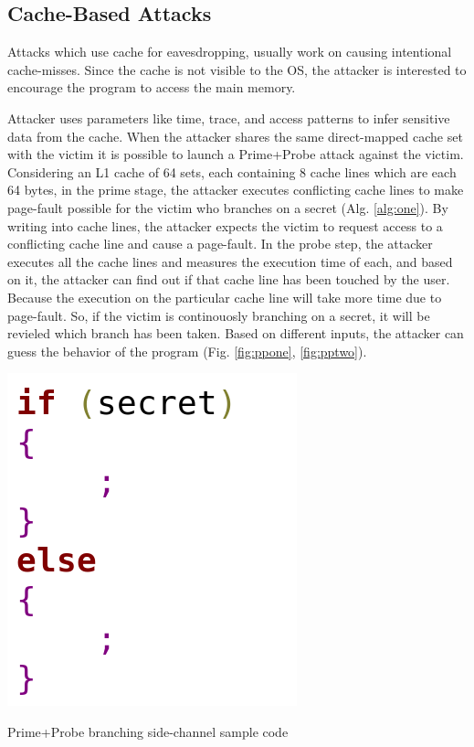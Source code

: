 \subsection{Cache-Based Attacks}
Attacks which use cache for eavesdropping, usually work on causing intentional cache-misses. Since the cache is not visible to the OS, the attacker is interested to encourage the program to access the main memory.

Attacker uses parameters like time, trace, and access patterns to infer sensitive data from the cache. When the attacker shares the same direct-mapped cache set with the victim it is possible to launch a Prime+Probe attack against the victim. Considering an L1 cache of 64 sets, each containing 8 cache lines which are each 64 bytes, in the prime stage, the attacker executes conflicting cache lines to make page-fault possible for the victim who branches on a secret (Alg. \ref{alg:one}). By writing into cache lines, the attacker expects the victim to request access to a conflicting cache line and cause a page-fault. In the probe step, the attacker executes all the cache lines and measures the execution time of each, and based on it, the attacker can find out if that cache line has been touched by the user. Because the execution on the particular cache line will take more time due to page-fault. So, if the victim is continouosly branching on a secret, it will be revieled which branch has been taken. Based on different inputs, the attacker can guess the behavior of the program \cite{primeprobe1,primeprobe2,cloak} (Fig. \ref{fig:ppone}, \ref{fig:pptwo}).

\begin{algorithm}[t]
	\includegraphics[scale=0.25]{images/alg}
	\caption{Prime+Probe branching side-channel sample code \cite{stealthy,cloak}}
	\label{alg:one}
\end{algorithm}

